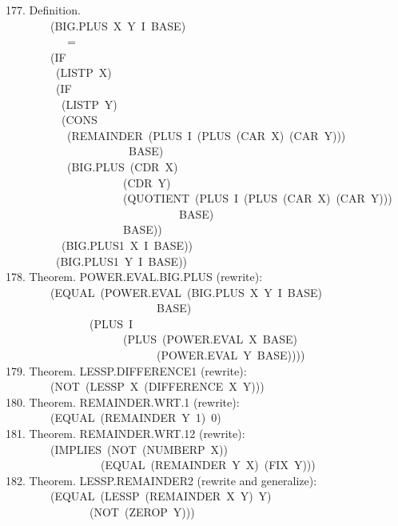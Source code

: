\documentclass[10pt]{book}
\newenvironment{pubasis}{\begin{flushleft}}{\end{flushleft}}
\begin{document}
\begin{pubasis}
177.    Definition.\\
~~~~~~~~(BIG.PLUS~X~Y~I~BASE)\\
~~~~~~~~~~~=\\
~~~~~~~~(IF\\
~~~~~~~~~(LISTP~X)\\
~~~~~~~~~(IF\\
~~~~~~~~~~(LISTP~Y)\\
~~~~~~~~~~(CONS\\
~~~~~~~~~~~(REMAINDER~(PLUS~I~(PLUS~(CAR~X)~(CAR~Y)))\\
~~~~~~~~~~~~~~~~~~~~~~BASE)\\
~~~~~~~~~~~(BIG.PLUS~(CDR~X)\\
~~~~~~~~~~~~~~~~~~~~~(CDR~Y)\\
~~~~~~~~~~~~~~~~~~~~~(QUOTIENT~(PLUS~I~(PLUS~(CAR~X)~(CAR~Y)))\\
~~~~~~~~~~~~~~~~~~~~~~~~~~~~~~~BASE)\\
~~~~~~~~~~~~~~~~~~~~~BASE))\\
~~~~~~~~~~(BIG.PLUS1~X~I~BASE))\\
~~~~~~~~~(BIG.PLUS1~Y~I~BASE))\\

178.    Theorem.  POWER.EVAL.BIG.PLUS (rewrite):\\
~~~~~~~~(EQUAL~(POWER.EVAL~(BIG.PLUS~X~Y~I~BASE)\\
~~~~~~~~~~~~~~~~~~~~~~~~~~~BASE)\\
~~~~~~~~~~~~~~~(PLUS~I\\
~~~~~~~~~~~~~~~~~~~~~(PLUS~(POWER.EVAL~X~BASE)\\
~~~~~~~~~~~~~~~~~~~~~~~~~~~(POWER.EVAL~Y~BASE))))\\

179.    Theorem.  LESSP.DIFFERENCE1 (rewrite):\\
~~~~~~~~(NOT~(LESSP~X~(DIFFERENCE~X~Y)))\\

180.    Theorem.  REMAINDER.WRT.1 (rewrite):\\
~~~~~~~~(EQUAL~(REMAINDER~Y~1)~0)\\

181.    Theorem.  REMAINDER.WRT.12 (rewrite):\\
~~~~~~~~(IMPLIES~(NOT~(NUMBERP~X))\\
~~~~~~~~~~~~~~~~~(EQUAL~(REMAINDER~Y~X)~(FIX~Y)))\\

182.    Theorem.  LESSP.REMAINDER2 (rewrite and generalize):\\
~~~~~~~~(EQUAL~(LESSP~(REMAINDER~X~Y)~Y)\\
~~~~~~~~~~~~~~~(NOT~(ZEROP~Y)))\\


\end{pubasis}
\end{document}
